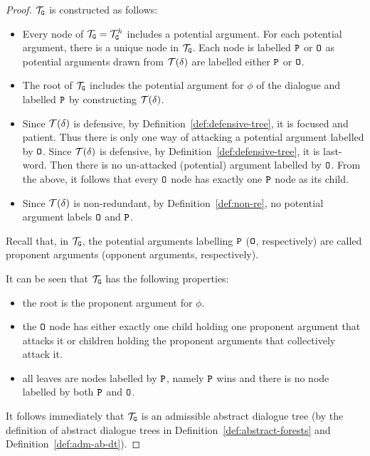\begin{proof}
$\mathcal{T}_{\texttt{\textup{G}}}$ is constructed as follows:

\begin{itemize}
    \item Every node of $\mathcal{T}_{\texttt{\textup{G}}} = \mathcal{T}_{\texttt{\textup{G}}}^{h}$ includes a potential argument. For each potential argument, there is a unique node in $\mathcal{T}_{\texttt{\textup{G}}}$. Each node is labelled $\texttt{\textup{P}}$ or $\texttt{\textup{O}}$ as potential arguments drawn from $\mathcal{T}(\delta)$ are labelled either $\texttt{\textup{P}}$ or $\texttt{\textup{O}}$. 

    \item  The root of $\mathcal{T}_{\texttt{\textup{G}}}$ includes the potential argument for $\phi$ of the dialogue and labelled $\texttt{\textup{P}}$ by constructing $\mathcal{T}(\delta)$.

    \item  Since $\mathcal{T}(\delta)$ is defensive, by Definition~\ref{def:defensive-tree}, it is focused and patient.
    Thus there is only one way of attacking a potential argument labelled by $\texttt{\textup{O}}$.  
    Since $\mathcal{T}(\delta)$ is defensive, by Definition~\ref{def:defensive-tree}, it is last-word.
    Then there is no un-attacked (potential) argument labelled by $\texttt{\textup{O}}$.
    From the above, it follows that every $\texttt{\textup{O}}$ node has exactly one $\texttt{\textup{P}}$ node as its child.

    \item Since $\mathcal{T}(\delta)$ is non-redundant, by Definition~\ref{def:non-re}, no potential argument labels $\texttt{\textup{O}}$ and $\texttt{\textup{P}}$.    
\end{itemize}

Recall that, in $\mathcal{T}_{\texttt{\textup{G}}}$, the potential arguments labelling $\texttt{\textup{P}}$ ($\texttt{\textup{O}}$, respectively) are called proponent arguments (opponent arguments, respectively). 

It can be seen that $\mathcal{T}_{\texttt{\textup{G}}}$ has the following properties:
\begin{itemize}
    \item the root is the proponent argument for $\phi$.
    \item the $\texttt{\textup{O}}$ node has either exactly one child holding one proponent argument that attacks it or children holding the proponent arguments that collectively attack it.
    \item all leaves are nodes labelled by $\texttt{\textup{P}}$, namely $\texttt{\textup{P}}$ wins and there is no node labelled by both $\texttt{\textup{P}}$ and $\texttt{\textup{O}}$.
\end{itemize}

It follows immediately that $\mathcal{T}_{\texttt{\textup{G}}}$ is an admissible abstract dialogue tree (by the definition of abstract dialogue trees in Definition~\ref{def:abstract-forests} and Definition~\ref{def:adm-ab-dt}).



\end{proof}
